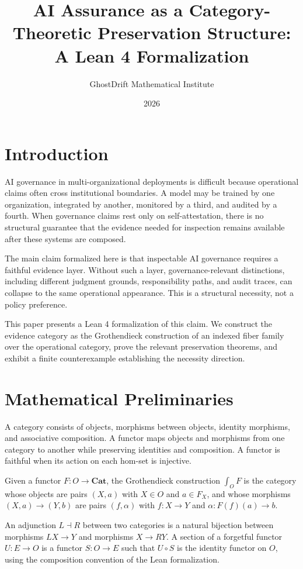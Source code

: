\documentclass{article}
\title{AI Assurance as a Category-Theoretic Preservation Structure:\\
       A Lean 4 Formalization}
\author{GhostDrift Mathematical Institute}
\date{2026}
\begin{document}
\maketitle

\section{Introduction}

AI governance in multi-organizational deployments is difficult because operational claims often cross institutional boundaries. A model may be trained by one organization, integrated by another, monitored by a third, and audited by a fourth. When governance claims rest only on self-attestation, there is no structural guarantee that the evidence needed for inspection remains available after these systems are composed.

The main claim formalized here is that inspectable AI governance requires a faithful evidence layer. Without such a layer, governance-relevant distinctions, including different judgment grounds, responsibility paths, and audit traces, can collapse to the same operational appearance. This is a structural necessity, not a policy preference.

This paper presents a Lean 4 formalization of this claim. We construct the evidence category as the Grothendieck construction of an indexed fiber family over the operational category, prove the relevant preservation theorems, and exhibit a finite counterexample establishing the necessity direction.

\section{Mathematical Preliminaries}

A category consists of objects, morphisms between objects, identity morphisms, and associative composition. A functor maps objects and morphisms from one category to another while preserving identities and composition. A functor is faithful when its action on each hom-set is injective.

Given a functor $F : O \to \mathbf{Cat}$, the Grothendieck construction $\int_O F$ is the category whose objects are pairs $(X,a)$ with $X \in O$ and $a \in F_X$, and whose morphisms $(X,a) \to (Y,b)$ are pairs $(f,\alpha)$ with $f : X \to Y$ and $\alpha : F(f)(a) \to b$.

An adjunction $L \dashv R$ between two categories is a natural bijection between morphisms $L X \to Y$ and morphisms $X \to RY$. A section of a forgetful functor $U : E \to O$ is a functor $S : O \to E$ such that $U \circ S$ is the identity functor on $O$, using the composition convention of the Lean formalization.
\end{document}
